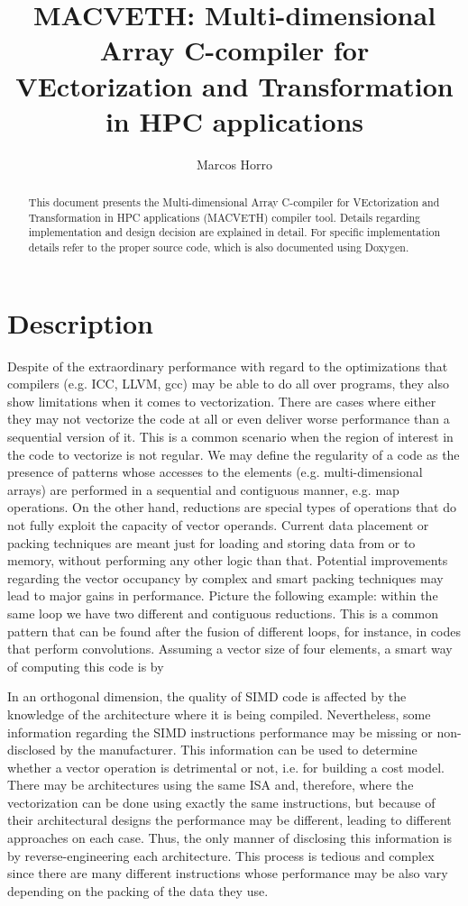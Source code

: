 \documentclass[a4paper,12pt]{memoir}
\title{\textbf{MACVETH}: \textbf{M}ulti-dimensional \textbf{A}rray
    \textbf{C}-compiler for \textbf{VE}ctorization and
    \textbf{T}ransformation in \textbf{H}PC applications}
\author{Marcos Horro}
\date{}
\begin{document}
\maketitle

\begin{abstract}
This document presents the Multi-dimensional Array C-compiler for VEctorization 
and Transformation in HPC applications (MACVETH) compiler tool. Details 
regarding implementation and design decision are explained in detail. For 
specific implementation details refer to the proper source code, which is also 
documented using Doxygen.
\end{abstract}

\chapter{Description}

Despite of the extraordinary performance with regard to the optimizations that compilers (e.g. ICC, LLVM, gcc) may be able to do all over programs, they also show limitations when it comes to vectorization. There are cases where either they may not vectorize the code at all or even deliver worse performance than a sequential version of it. This is a common scenario when the region of interest in the code to vectorize is not regular. We may define the regularity of a code as the presence of patterns whose accesses to the elements (e.g. multi-dimensional arrays) are performed in a sequential and contiguous manner, e.g. map operations. On the other hand, reductions are special types of operations that do not fully exploit the capacity of vector operands. Current data placement or packing techniques are meant just for loading and storing data from or to memory, without performing any other logic than that. Potential improvements regarding the vector occupancy by complex and smart packing techniques may lead to major gains in performance. Picture the following example: within the same loop we have two different and contiguous reductions. This is a common pattern that can be found after the fusion of different loops, for instance, in codes that perform convolutions. Assuming a vector size of four elements, a smart way of computing this code is by 

In an orthogonal dimension, the quality of SIMD code is affected by the knowledge of the architecture where it is being compiled. Nevertheless, some information regarding the SIMD instructions performance may be missing or non-disclosed by the manufacturer. This information can be used to determine whether a vector operation is detrimental or not, i.e. for building a cost model. There may be architectures using the same ISA and, therefore, where the vectorization can be done using exactly the same instructions, but because of their architectural designs the performance may be different, leading to different approaches on each case. Thus, the only manner of disclosing this information is by reverse-engineering each architecture. This process is tedious and complex since there are many different instructions whose performance may be also vary depending on the packing of the data they use.
\end{document}
